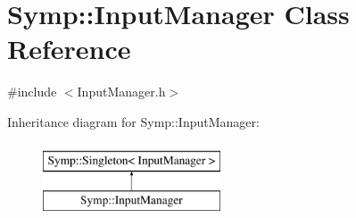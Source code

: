 \hypertarget{class_symp_1_1_input_manager}{\section{Symp\-:\-:Input\-Manager Class Reference}
\label{class_symp_1_1_input_manager}
}


{\ttfamily \#include $<$Input\-Manager.\-h$>$}

Inheritance diagram for Symp\-:\-:Input\-Manager\-:\begin{figure}[H]
\begin{center}
\leavevmode
\includegraphics[height=2.000000cm]{class_symp_1_1_input_manager}
\end{center}
\end{figure}
